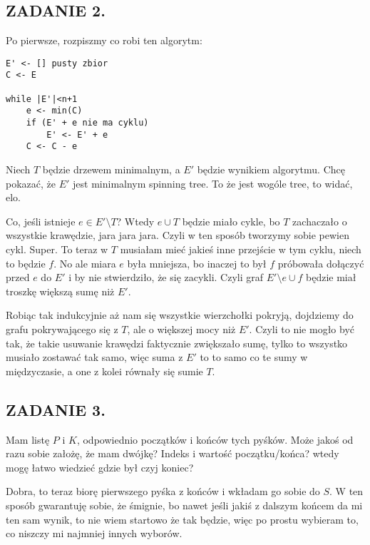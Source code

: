 \documentclass{article}
\begin{document}
\subsection*{ZADANIE 2.}

Po pierwsze, rozpiszmy co robi ten algorytm:


\begin{lstlisting}
E' <- [] pusty zbior
C <- E

while |E'|<n+1
    e <- min(C)
    if (E' + e nie ma cyklu)
        E' <- E' + e
    C <- C - e
\end{lstlisting}

Niech $T$ będzie drzewem minimalnym, a $E'$ będzie wynikiem algorytmu. Chcę pokazać, że $E'$ jest minimalnym spinning tree. To że jest wogóle tree, to widać, elo.

Co, jeśli istnieje $e\in E'\setminus T$? Wtedy $e\cup T$ będzie miało cykle, bo $T$ zachaczało o wszystkie krawędzie, jara jara jara. Czyli w ten sposób tworzymy sobie pewien cykl. Super. To teraz w $T$ musiałam mieć jakieś inne przejście w tym cyklu, niech to będzie $f$. No ale miara $e$ była mniejsza, bo inaczej to był $f$ próbowała dołączyć przed $e$ do $E'$ i by nie stwierdziło, że się zacykli. Czyli graf $E'\setminus e\cup f$ będzie miał troszkę większą sumę niż $E'$. 

Robiąc tak indukcyjnie aż nam się wszystkie wierzchołki pokryją, dojdziemy do grafu pokrywającego się z $T$, ale o większej mocy niż $E'$. Czyli to nie mogło być tak, że takie usuwanie krawędzi faktycznie zwiększało sumę, tylko to wszystko musiało zostawać tak samo, więc suma z $E'$ to to samo co te sumy w międzyczasie, a one z kolei równały się sumie $T$.

\subsection*{ZADANIE 3.}

Mam listę $P$ i $K$, odpowiednio początków i końców tych pyśków. Może jakoś od razu sobie założę, że mam dwójkę? Indeks i wartość początku/końca? wtedy mogę łatwo wiedzieć gdzie był czyj koniec?

Dobra, to teraz biorę pierwszego pyśka z końców i wkładam go sobie do $S$. W ten sposób gwarantuję sobie, że śmignie, bo nawet jeśli jakiś z dalszym końcem da mi ten sam wynik, to nie wiem startowo że tak będzie, więc po prostu wybieram to, co niszczy mi najmniej innych wyborów.
\end{document}

